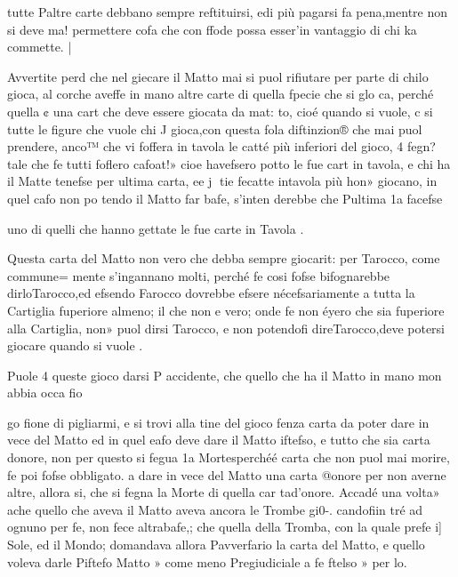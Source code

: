 \documentclass[12pt,a6paper]{article}
\begin{document}
 

 

 

 

 

tutte Paltre carte debbano sempre reftituirsi, edi più pagarsi
fa pena,mentre non si deve ma!
permettere cofa che con ffode possa esser’in vantaggio di
chi ka commette. |

Avvertite perd che nel giecare il Matto mai si puol rifiutare per parte di chilo gioca, al
corche aveffe in mano altre
carte di quella fpecie che si glo
ca, perché quella ¢ una cart
che deve essere giocata da mat:
to, cioé quando si vuole, c si
tutte le figure che vuole chi J
gioca,con questa fola diftinzion®
che mai puol prendere, anco™
che vi foffera in tavola le catté
più inferiori del gioco, 4 fegn?
tale che fe tutti foflero cafoat!»
cioe havefsero potto le fue cart
in tavola, e chi ha il Matte
tenefse per ultima carta, ee j
tie fecatte intavola più hon»
giocano, in quel cafo non po
tendo il Matto far bafe, s'inten
derebbe che Pultima 1a facefse

uno di quelli che hanno gettate
le fue carte in Tavola .

Questa carta del Matto non 
vero che debba sempre giocarit:
per Tarocco, come commune=
mente s'ingannano molti, perché fe cosi fofse bifognarebbe
dirloTarocco,ed efsendo Farocco dovrebbe efsere nécefsariamente a tutta la Cartiglia fuperiore almeno; il che non e vero; onde fe non éyero che sia
fuperiore alla Cartiglia, non»
puol dirsi Tarocco, e non potendofi direTarocco,deve potersi
giocare quando si vuole .

Puole 4 queste gioco darsi P
accidente, che quello che ha il
Matto in mano mon abbia occa
fio
 

 
 

go
fione di pigliarmi, e si trovi alla tine del gioco fenza carta da
poter dare in vece del Matto
ed in quel eafo deve dare il Matto iftefso, e tutto che sia carta
donore, non per questo si fegua
1a Mortesperchéé carta che non
puol mai morire, fe poi fofse
obbligato. a dare in vece del
Matto una carta @onore per
non averne altre, allora si, che
si fegna la Morte di quella car
tad’onore. Accadé una volta»
ache quello che aveva il Matto
aveva ancora le Trombe gi0-.
candofiin tré ad ognuno per fe,
non fece altrabafe,; che quella
della Tromba, con la quale prefe i] Sole, ed il Mondo; domandava allora Pavverfario la carta
del Matto, e quello voleva darle Piftefo Matto » come meno
Pregiudiciale a fe ftelso » per lo.
\end{document}

